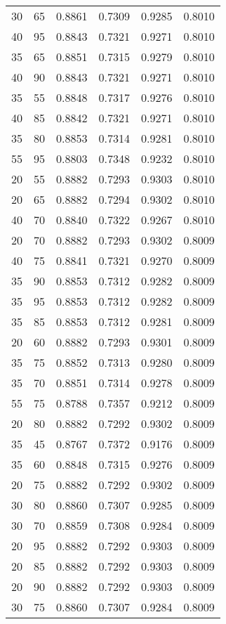 \begin{center}
\begin{longtable}{|l|l|l|l|l|l|}
30 & 65 & 0.8861 & 0.7309 & 0.9285 & 0.8010 \\
40 & 95 & 0.8843 & 0.7321 & 0.9271 & 0.8010 \\
35 & 65 & 0.8851 & 0.7315 & 0.9279 & 0.8010 \\
40 & 90 & 0.8843 & 0.7321 & 0.9271 & 0.8010 \\
35 & 55 & 0.8848 & 0.7317 & 0.9276 & 0.8010 \\
40 & 85 & 0.8842 & 0.7321 & 0.9271 & 0.8010 \\
35 & 80 & 0.8853 & 0.7314 & 0.9281 & 0.8010 \\
55 & 95 & 0.8803 & 0.7348 & 0.9232 & 0.8010 \\
20 & 55 & 0.8882 & 0.7293 & 0.9303 & 0.8010 \\
20 & 65 & 0.8882 & 0.7294 & 0.9302 & 0.8010 \\
40 & 70 & 0.8840 & 0.7322 & 0.9267 & 0.8010 \\
20 & 70 & 0.8882 & 0.7293 & 0.9302 & 0.8009 \\
40 & 75 & 0.8841 & 0.7321 & 0.9270 & 0.8009 \\
35 & 90 & 0.8853 & 0.7312 & 0.9282 & 0.8009 \\
35 & 95 & 0.8853 & 0.7312 & 0.9282 & 0.8009 \\
35 & 85 & 0.8853 & 0.7312 & 0.9281 & 0.8009 \\
20 & 60 & 0.8882 & 0.7293 & 0.9301 & 0.8009 \\
35 & 75 & 0.8852 & 0.7313 & 0.9280 & 0.8009 \\
35 & 70 & 0.8851 & 0.7314 & 0.9278 & 0.8009 \\
55 & 75 & 0.8788 & 0.7357 & 0.9212 & 0.8009 \\
20 & 80 & 0.8882 & 0.7292 & 0.9302 & 0.8009 \\
35 & 45 & 0.8767 & 0.7372 & 0.9176 & 0.8009 \\
35 & 60 & 0.8848 & 0.7315 & 0.9276 & 0.8009 \\
20 & 75 & 0.8882 & 0.7292 & 0.9302 & 0.8009 \\
30 & 80 & 0.8860 & 0.7307 & 0.9285 & 0.8009 \\
30 & 70 & 0.8859 & 0.7308 & 0.9284 & 0.8009 \\
20 & 95 & 0.8882 & 0.7292 & 0.9303 & 0.8009 \\
20 & 85 & 0.8882 & 0.7292 & 0.9303 & 0.8009 \\
20 & 90 & 0.8882 & 0.7292 & 0.9303 & 0.8009 \\
30 & 75 & 0.8860 & 0.7307 & 0.9284 & 0.8009 \\

\end{longtable}
\end{center}
